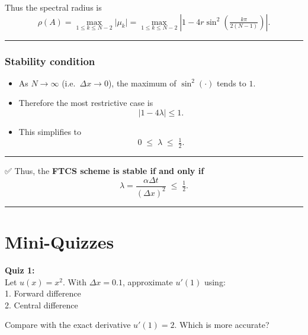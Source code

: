 \documentclass[
  letterpaper,
]{book}
\providecommand{\tightlist}{%
  \setlength{\itemsep}{0pt}\setlength{\parskip}{0pt}}
\begin{document}
\begin{tcolorbox}
Thus the spectral radius is \[
\rho(A) = \max_{1\le k \le N-2} \big|\mu_k\big|
= \max_{1\le k \le N-2} \left|1 - 4r \sin^2\!\left(\tfrac{k\pi}{2(N-1)}\right)\right|.
\]

\begin{center}\rule{0.5\linewidth}{0.5pt}\end{center}

\subsubsection{Stability condition}\label{stability-condition-1}

\begin{itemize}
\tightlist
\item
  As \(N\to\infty\) (i.e.~\(\Delta x \to 0\)), the maximum of
  \(\sin^2(\cdot)\) tends to \(1\).\\
\item
  Therefore the most restrictive case is \[
  |1 - 4 \lambda| \le 1.
  \]
\item
  This simplifies to \[
  0 \;\le\; \lambda \;\le\; \tfrac{1}{2}.
  \]
\end{itemize}

\begin{center}\rule{0.5\linewidth}{0.5pt}\end{center}

✅ Thus, the \textbf{FTCS scheme is stable if and only if} \[
\lambda = \frac{\alpha \Delta t}{(\Delta x)^2} \;\le\; \tfrac{1}{2}.
\]

\end{tcolorbox}

\begin{center}\rule{0.5\linewidth}{0.5pt}\end{center}

\section{Mini-Quizzes}\label{mini-quizzes-1}

\textbf{Quiz 1:}\\
Let \(u(x) = x^2\). With \(\Delta x = 0.1\), approximate \(u'(1)\)
using:\\
1. Forward difference\\
2. Central difference

Compare with the exact derivative \(u'(1) = 2\). Which is more accurate?
\end{document}
